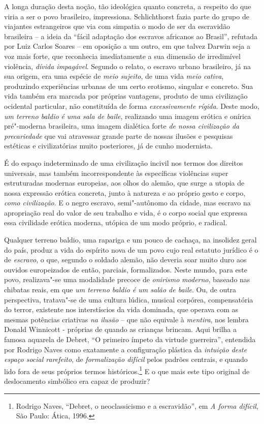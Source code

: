 A longa duração desta noção, tão ideológica quanto concreta, a respeito
do que viria a ser o povo brasileiro, impressiona. Schlichthorst fazia
parte do grupo de viajantes estrangeiros que via com simpatia o modo de
ser da escravidão brasileira -- a ideia da ``fácil adaptação dos
escravos africanos ao Brasil'', refutada por Luiz Carlos Soares -- em
oposição a um outro, em que talvez Darwin seja a voz mais forte, que
reconhecia imediatamente a sua dimensão de irredimível violência,
\emph{dívida impagável}. Segundo o relato, o escravo urbano brasileiro,
já na sua origem, era uma espécie de \emph{meio sujeito}, de uma vida
\emph{meio cativa}, produzindo experiências urbanas de um certo
erotismo, singular e concreto. Sua vida também era marcada por próprias
vantagens, produto de uma civilização ocidental particular, não
constituída de forma \emph{excessivamente rígida}. Deste modo, \emph{um
terreno baldio} \emph{é uma sala de baile}, realizando uma imagem
erótica e onírica pré"-moderna brasileira, uma imagem dialética forte
\emph{de nossa civilização da precariedade} que vai
atravessar grande parte de nossas ilusões e pesquisas estéticas e
civilizatórias muito posteriores, já de cunho modernista.

É do espaço indeterminado de uma civilização incivil nos termos dos
direitos universais, mas também incorrespondente às específicas
violências super estruturadas modernas europeias, aos olhos do alemão,
que surge a utopia de nossa expressão erótica concreta, junto à natureza
e ao próprio gesto e corpo, \emph{como civilização}. E o negro escravo,
semi"-autônomo da cidade, mas escravo na apropriação real do valor de seu
trabalho e vida, é o corpo social que expressa essa civilidade erótica
moderna, utópica de um modo próprio, e radical.

Qualquer terreno baldio, uma rapariga e um pouco de cachaça, na
insolidez geral do país, produz a vida do espírito nova de um povo cujo
real estatuto jurídico é o de \emph{escravo}, o que, segundo o soldado
alemão, não deveria soar muito duro aos ouvidos europeizados de então,
parciais, formalizados. Neste mundo, para este povo, realizava"-se uma
modalidade precoce de \emph{onirismo} \emph{moderno}, baseado nas
chibatas reais, em que \emph{um terreno baldio é um salão de baile}. Ou,
de outra perspectiva, tratava"-se de uma cultura lúdica, musical
corpórea, compensatória do terror, existente nos interstíscios da vida
dominada, que operava com as mesmas potências criativas \emph{na ilusão}
-- que não equivale à \emph{mentira}, nos lembra Donald Winnicott -
próprias de quando as crianças brincam. Aqui brilha a famosa aquarela de
Debret, ``O primeiro ímpeto da virtude guerreira'', entendida por
Rodrigo Naves como exatamente a configuração plástica da \emph{intuição
deste espaço social rarefeito}, de \emph{formalização difícil} pelos
padrões centrais, e quando lido fora de seus próprios termos
históricos.\footnote{Rodrigo Naves, ``Debret, o neoclassicismo e a
  escravidão'', em \emph{A forma difícil}, São Paulo: Ática, 1996.} E o
que mais este tipo original de deslocamento simbólico era capaz de
produzir?

